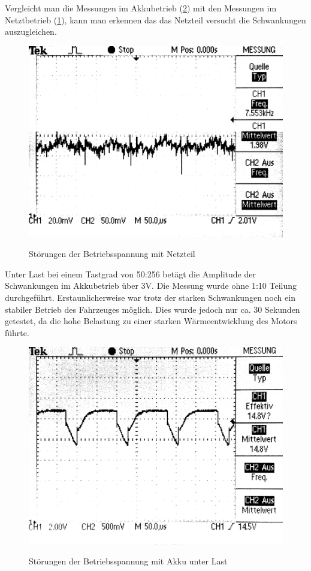Vergleicht man die Messungen im Akkubetrieb (\cref{fig:akku_supply}) mit den Messungen im Netztbetrieb (\cref{fig:power_supply}), kann man erkennen das das Netzteil versucht die Schwankungen auszugleichen.

\begin{figure}[H]
\centering
\includegraphics[width=.8\textwidth]{VCC_SUPPLY.png}\\
\caption{Störungen der Betriebsspannung mit Netzteil}%
\label{fig:power_supply}
\end{figure}

Unter Last bei einem Tastgrad von 50:256 betägt die Amplitude der Schwankungen im Akkubetrieb über 3V. Die Messung wurde ohne 1:10 Teilung durchgeführt.
Erstaunlicherweise war trotz der starken Schwankungen noch ein stabiler Betrieb des Fahrzeuges möglich. Dies wurde jedoch nur ca. 30 Sekunden getestet, da
die hohe Belastung zu einer starken Wärmeentwicklung des Motors führte.

\begin{figure}[H]
\centering
\includegraphics[width=.8\textwidth]{VCC_AKKU_LAST.png}\\
\caption{Störungen der Betriebsspannung mit Akku unter Last}%
\label{fig:akku_supply}
\end{figure}

